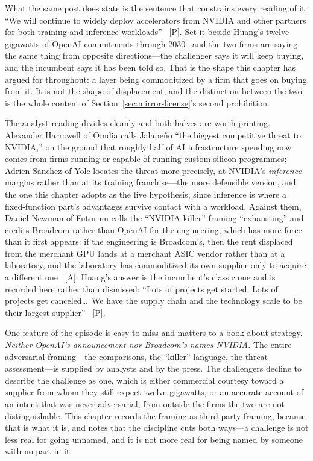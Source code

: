What the same post does state is the sentence that constrains every reading of it: ``We will continue to widely deploy accelerators from NVIDIA and other partners for both training and inference workloads''~\cite{jalapeno-results} [P]. Set it beside Huang's twelve gigawatts of OpenAI commitments through 2030~\cite{nvda-huang-q2} and the two firms are saying the same thing from opposite directions---the challenger says it will keep buying, and the incumbent says it has been told so. That is the shape this chapter has argued for throughout: a layer being commoditized by a firm that goes on buying from it. It is not the shape of displacement, and the distinction between the two is the whole content of Section~\ref{sec:mirror-license}'s second prohibition.

The analyst reading divides cleanly and both halves are worth printing. Alexander Harrowell of Omdia calls Jalape\~no ``the biggest competitive threat to NVIDIA,'' on the ground that roughly half of AI infrastructure spending now comes from firms running or capable of running custom-silicon programmes; Adrien Sanchez of Yole locates the threat more precisely, at NVIDIA's \emph{inference} margins rather than at its training franchise---the more defensible version, and the one this chapter adopts as the live hypothesis, since inference is where a fixed-function part's advantages survive contact with a workload. Against them, Daniel Newman of Futurum calls the ``NVIDIA killer'' framing ``exhausting'' and credits Broadcom rather than OpenAI for the engineering, which has more force than it first appears: if the engineering is Broadcom's, then the rent displaced from the merchant GPU lands at a merchant ASIC vendor rather than at a laboratory, and the laboratory has commoditized its own supplier only to acquire a different one~\cite{jalapeno-analysts} [A]. Huang's answer is the incumbent's classic one and is recorded here rather than dismissed: ``Lots of projects get started. Lots of projects get canceled\ldots\ We have the supply chain and the technology scale to be their largest supplier''~\cite{jalapeno-analysts} [P].

One feature of the episode is easy to miss and matters to a book about strategy. \emph{Neither OpenAI's announcement nor Broadcom's names NVIDIA.} The entire adversarial framing---the comparisons, the ``killer'' language, the threat assessment---is supplied by analysts and by the press. The challengers decline to describe the challenge as one, which is either commercial courtesy toward a supplier from whom they still expect twelve gigawatts, or an accurate account of an intent that was never adversarial; from outside the firms the two are not distinguishable. This chapter records the framing as third-party framing, because that is what it is, and notes that the discipline cuts both ways---a challenge is not less real for going unnamed, and it is not more real for being named by someone with no part in it.

